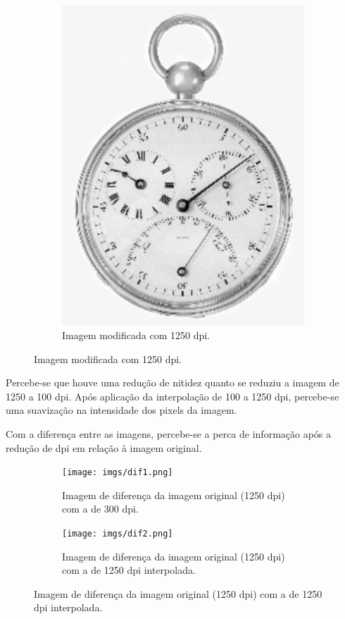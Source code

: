 \documentclass{article}
\begin{document}
\begin{figure}[H]
\begin{subfigure}[b]{0.3\textwidth}
        \includegraphics[width=\textwidth]{imgs/3.png}
        \caption{Imagem modificada com 1250 dpi.}
        \label{fig:clock_1250dpi}
    \end{subfigure}
    \label{fig:clock_comparison}
\end{figure}

Percebe-se que houve uma redução de nitidez quanto se reduziu a imagem de 1250 a 100 dpi.
Após aplicação da interpolação de 100 a 1250 dpi, percebe-se uma suavização na intensidade dos pixels da imagem.

Com a diferença entre as imagens, percebe-se a perca de informação após a redução de dpi em relação à imagem original.
\begin{figure}[H]
    \centering
    \caption{Imagens diferença do relógio.}
    \begin{subfigure}[b]{0.3\textwidth}
        \texttt{[image: imgs/dif1.png]}
        \caption{Imagem de diferença da imagem original (1250 dpi) com a de 300 dpi.}
        \label{fig:clock_original}
    \end{subfigure}%
    \hfill
    \begin{subfigure}[b]{0.3\textwidth}
        \texttt{[image: imgs/dif2.png]}
        \caption{Imagem de diferença da imagem original (1250 dpi) com a de 1250 dpi interpolada.}
        \label{fig:clock_300dpi}
    \end{subfigure}%
    \label{fig:clock_comparison}
\end{figure}
\end{document}
